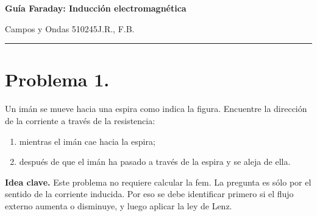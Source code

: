 \documentclass[11pt]{article}
\newcommand{\encabezado}[3]{%
{\Large\bfseries #1\par}
\vspace{2pt}
{\normalsize #2\hfill #3\par}
\vspace{6pt}\hrule\vspace{8pt}}
\newcommand{\ideaclave}[1]{%
  \par\medskip
  \noindent\textbf{Idea clave.} #1\par
}
\begin{document}
\encabezado{Guía Faraday: Inducción electromagnética}{Campos y Ondas 510245}{J.R., F.B.}
\shorthandoff{<>}

\section*{Problema 1.}
Un im\'an se mueve hacia una espira como indica la figura. Encuentre la direcci\'on de la corriente a trav\'es de la resistencia:
\begin{enumerate}[label=(\alph*)]
    \item mientras el im\'an cae hacia la espira;
    \item despu\'es de que el im\'an ha pasado a trav\'es de la espira y se aleja de ella.
\end{enumerate}

\ideaclave{Este problema no requiere calcular la fem. La pregunta es s\'olo por el sentido de la corriente inducida. Por eso se debe identificar primero si el flujo externo aumenta o disminuye, y luego aplicar la ley de Lenz.}
\end{document}
